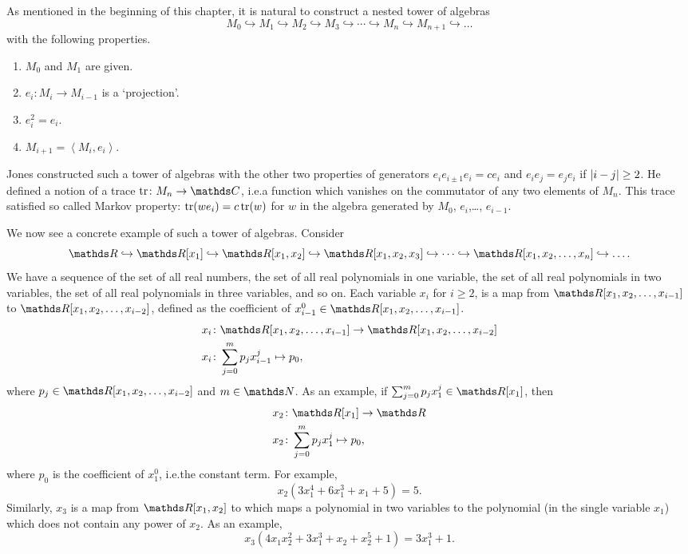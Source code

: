As mentioned in the beginning of this chapter, it is natural to construct a nested tower of algebras \[M_0 \hookrightarrow M_1 \hookrightarrow M_2 \hookrightarrow M_3\hookrightarrow \cdots \hookrightarrow M_n \hookrightarrow M_{n+1} \hookrightarrow\ldots\] with the following properties.
\begin{enumerate}
    \item \(M_0\) and \(M_1\) are given.
	\item \(e_i\colon M_i \rightarrow M_{i-1}\) is a `projection'.
	\item \(e_i^2 = e_i\).
	\item \(M_{i+1} = \left\langle M_i,e_i\right\rangle\).
\end{enumerate}
Jones constructed such a tower of algebras with the other two properties of generators \(e_ie_{i\pm 1} e_i = ce_i\) and \(e_ie_j = e_je_i\) if \(\lvert i-j\rvert \geq 2\). He defined a notion of a trace \(\tr\colon M_n \rightarrow \C\), i.e.\@ a function which vanishes on the commutator of any two elements of \(M_n\). This trace satisfied so called Markov property: \(\operatorname{tr}(we_i) = c\operatorname{tr}(w)\) for \(w\) in the algebra generated by \(M_0\), \(e_i\),\ldots, \(e_{i-1}\).

We now see a concrete example of such a tower of algebras. Consider \[\R \hookrightarrow \R[x_1] \hookrightarrow \R[x_1, x_2] \hookrightarrow \R[x_1, x_2, x_3] \hookrightarrow \cdots \hookrightarrow \R[x_1, x_2, \ldots, x_n] \hookrightarrow \ldots.\] We have a sequence of the set of all real numbers, the set of all real polynomials in one variable, the set of all real polynomials in two variables, the set of all real polynomials in three variables, and so on. Each variable \(x_i\) for \(i\geq 2\), is a map from \(\R[x_1, x_2, \ldots, x_{i-1}]\) to \(\R[x_1, x_2, \ldots, x_{i-2}]\), defined as the coefficient of \(x_{i-1}^0 \in \R[x_1, x_2, \ldots, x_{i-1}]\).
\begin{align*}
	x_i &\colon \R[x_1, x_2, \ldots, x_{i-1}] \rightarrow \R[x_1, x_2, \ldots, x_{i-2}]\\
	x_i &\colon \sum_{j=0}^{m}p_j x^{j}_{i-1} \mapsto p_0,
\end{align*}
where \(p_j \in \R[x_1, x_2, \ldots, x_{i-2}]\) and \(m\in\n\). As an example, if \(\sum_{j=0}^{m}p_j x^{j}_1 \in \R[x_1]\), then
\begin{align*}
    x_2 &\colon \R[x_1] \rightarrow \R\\
	x_2 &\colon \sum_{j=0}^{m}p_j x^{j}_1 \mapsto p_0,
\end{align*}
where \(p_0\) is the coefficient of \(x_1^0\), i.e.\@ the constant term. For example, \[x_2 (3x_1^4 + 6x_1^3 + x_1 + 5) = 5.\] Similarly, \(x_3\) is a map from \(\R[x_1, x_2]\) to which maps a polynomial in two variables to the polynomial (in the single variable \(x_1\)) which does not contain any power of \(x_2\). As an example, \[x_3(4x_1x_2^2 + 3x_1^3 + x_2 + x_2^5 + 1) = 3x_1^3 + 1.\]

